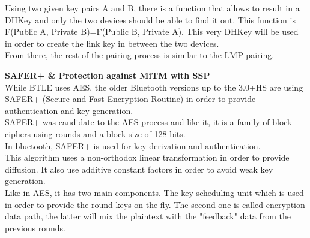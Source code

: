 Using two given key pairs A and B, there is a function that allows to result in a DHKey and only the two devices should be able to find it out. This function is F(Public A, Private B)=F(Public B, Private A). This very DHKey will be used in order to create the link key in between the two devices. \\ 
From there, the rest of the pairing process is similar to the LMP-pairing.

\newpage
\textbf{SAFER+ \& Protection against MiTM with SSP}\\

While BTLE uses AES, the older Bluetooth versions up to the 3.0+HS are using SAFER+ (Secure and Fast Encryption Routine) in order to provide authentication and key generation.\\
SAFER+ was candidate to the AES process and like it, it is a family of block ciphers using rounds  and a block size of 128 bits.\\
In bluetooth, SAFER+ is used for key derivation and authentication.\\
This algorithm  uses a non-orthodox linear transformation in order to provide diffusion. It also use additive constant factors in order to avoid weak key generation.\\
Like in AES, it has two main components. The key-scheduling unit which is used in order to provide the round keys on the fly. The second one is called encryption data path, the latter will mix the plaintext with the "feedback" data from the previous rounds.\\


